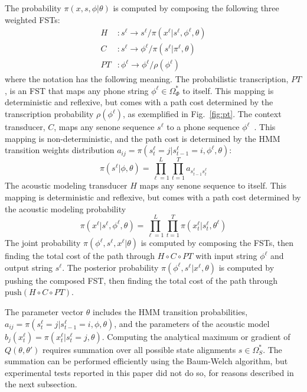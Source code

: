 The probability $\pi(x,s,\phi|\theta)$ is computed by composing the
following three weighted FSTs:
\begin{align}
  H&:s^\ell\rightarrow s^\ell/ \pi(x^\ell|s^\ell,\phi^\ell,\theta)\\
  C&:s^\ell\rightarrow \phi^\ell/ \pi(s^\ell|\pi^\ell,\theta)\\
  PT&:\phi^\ell\rightarrow\phi^\ell/ \rho(\phi^\ell)
\end{align}
where the notation has the following meaning.  The probabilistic
transcription, $PT$, is an FST that maps any phone string
$\phi^\ell\in\Omega_\Phi^*$ to itself.  This mapping is deterministic
and reflexive, but comes with a path cost determined by the
transcription probability $\rho(\phi^\ell)$, as exemplified in
Fig.~\ref{fig:pt}.  The context transducer, $C$, maps any senone
sequence $s^\ell$ to a phone sequence $\phi^\ell$~\cite{Mohri2002}.
This mapping is non-deterministic, and the path cost is determined by
the HMM transition weights distribution
$a_{ij}=\pi(s_t^{\ell}=j|s_{t-1}^\ell =i,\phi^\ell,\theta)$:
\begin{equation}
  \pi(s^\ell|\phi,\theta)=\prod_{\ell=1}^L\prod_{t=1}^T
  a_{s_{t-1}^\ell s_t^\ell}
\end{equation}
The acoustic modeling transducer $H$ maps any senone sequence to
itself.  This mapping is deterministic and reflexive, but comes with a
path cost determined by the acoustic modeling probability
\begin{equation}
  \pi(x^\ell|s^\ell,\phi^\ell,\theta)=\prod_{\ell=1}^L\prod_{t=1}^T
  \pi(x_t^\ell|s_t^\ell,\theta^\ell)
\end{equation}
The joint probability $\pi(\phi^\ell,s^\ell,x^\ell|\theta)$ is
computed by composing the FSTs, then finding the total cost of the
path through $H\circ C\circ PT$ with input string $\phi^\ell$ and
output string $s^\ell$.  The posterior probability
$\pi(\phi^\ell,s^\ell|x^\ell,\theta)$ is computed by pushing the
composed FST, then finding the total cost of the path through
$\textrm{push}\left(H\circ C\circ PT\right)$.

The parameter vector $\theta$ includes the HMM transition
probabilities, $a_{ij}=\pi(s_t^\ell =j|s_{t-1}^\ell =i,\phi,\theta)$,
and the parameters of the acoustic model
$b_j(x_t^\ell)=\pi(x_t^\ell|s_t^\ell=j,\theta)$.  Computing the
analytical maximum or gradient of $Q\left(\theta,\theta'\right)$
requires summation over all possible state alignments
$s\in\Omega_S^*$.  The summation can be performed efficiently using
the Baum-Welch algorithm, but experimental tests reported in this
paper did not do so, for reasons described in the next subsection.
